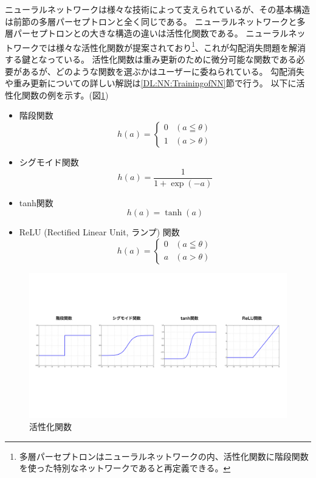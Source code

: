 ニューラルネットワークは様々な技術によって支えられているが、その基本構造は前節の多層パーセプトロンと全く同じである。
ニューラルネットワークと多層パーセプトロンとの大きな構造の違いは活性化関数である。
ニューラルネットワークでは様々な活性化関数が提案されており\footnote{多層パーセプトロンはニューラルネットワークの内、活性化関数に階段関数を使った特別なネットワークであると再定義できる。}、これが勾配消失問題を解消する鍵となっている。
活性化関数は重み更新のために微分可能な関数である必要があるが、どのような関数を選ぶかはユーザーに委ねられている。
勾配消失や重み更新についての詳しい解説は\ref{DL:NN:TrainingofNN}節で行う。
以下に活性化関数の例を示す。(図\ref{5ActivationFunction})
\begin{itemize}
  \item 階段関数
\begin{equation}
 h(a) = \left\{ \begin{array}{ll}
    0 & (a \leqq \theta) \\
    1 & (a > \theta)
 \end{array} \right.
\end{equation}
  \item シグモイド関数
\begin{equation}
 h(a) = \frac{1}{1+\exp{(-a)}}
\end{equation}
  \item tanh関数
\begin{equation}
 h(a) = \tanh{(a)}
\end{equation}
  \item ReLU (Rectified Linear Unit, ランプ) 関数\cite{ReLUpaper}
\begin{equation}
 h(a) = \left\{ \begin{array}{ll}
    0 & (a \leqq \theta) \\
    a & (a > \theta)
 \end{array} \right.
\end{equation}
\end{itemize}

\begin{figure}[htbp]
 \centering
 \includegraphics[trim = 0 200 0 200, width=1.0\textwidth, clip]{Figure/2DeepLearning/5ActivationFunction.png}
 \caption{活性化関数}
 \label{5ActivationFunction}
\end{figure}

